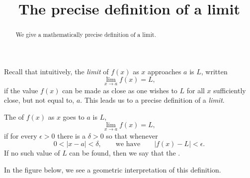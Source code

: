 \documentclass{ximera}
\title[Dig-In:]{The precise definition of a limit}
\begin{document}
\begin{abstract}
  We give a mathematically precise definition of a limit.
\end{abstract}
\maketitle

Recall that intuitively, the \textit{limit} of $f(x)$ as $x$
approaches $a$ is $L$, written
\[
\lim_{x\to a} f(x) = L,
\]
if the value $f(x)$ can be made as close as one wishes to $L$ for
all $x$ sufficiently close, but not equal to, $a$.  This leads us to a
precise definition of a \textit{limit}.


\begin{definition}\label{def:limit}
The  of $f(x)$ as $x$ goes to $a$ is $L$,
\[
\lim_{x\to a} f(x) = L,
\] 
if for every $\epsilon>0$ there is a $\delta > 0$ so that whenever
\[
0 < |x-a| < \delta, \qquad\text{we have} \qquad |f(x)-L|<\epsilon.
\] 
If no such value of $L$ can be found, then we say that the .
\end{definition}

In the figure below, we see a geometric interpretation of this
definition.
\end{document}
